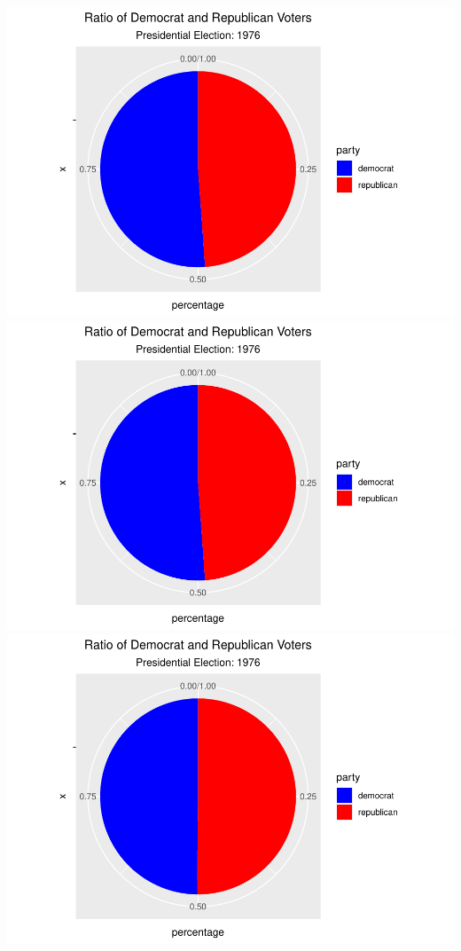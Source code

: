\documentclass[
]{article}
\begin{document}
\includegraphics{election_files/figure-latex/anim-4.pdf}
\includegraphics{election_files/figure-latex/anim-5.pdf}
\includegraphics{election_files/figure-latex/anim-6.pdf}
\end{document}
